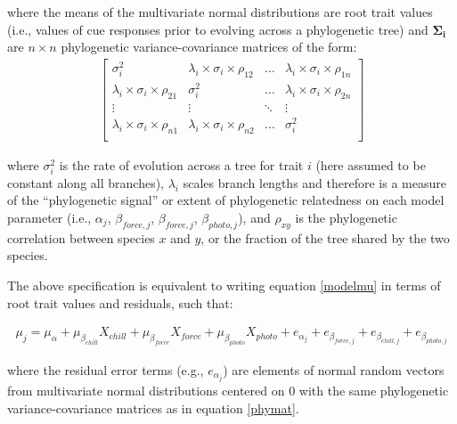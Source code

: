 \documentclass[11pt]{article}
\begin{document}
\noindent where the means of the multivariate normal distributions are root trait values (i.e., values of cue responses prior to evolving across a phylogenetic tree) and $\boldsymbol{\Sigma_i}$ %
are $n \times n$ phylogenetic variance-covariance matrices of the form: \\ 
\begin{align}
  \label{phymat}
\begin{bmatrix}
  \sigma^2_i & \lambda_i \times \sigma_{i} \times \rho_{12} & \ldots & \lambda_i \times \sigma_{i} \times \rho_{1n} \\
  \lambda_i \times \sigma_i \times \rho_{21} & \sigma^2_i & \ldots & \lambda_i \times \sigma_{i} \times \rho_{2n} \\
  \vdots & \vdots & \ddots & \vdots \\
  \lambda_i \times \sigma_i \times \rho_{n1} & \lambda_i \times \sigma_i \times \rho_{n2} & \ldots & \sigma^2_i \\
\end{bmatrix}
\end{align}

\noindent where $\sigma_i^2$ is the rate of evolution across a tree for trait $i$ (here assumed to be constant along all branches), $\lambda_i$ scales branch lengths and therefore is a measure of the ``phylogenetic signal'' or extent of phylogenetic relatedness on each model parameter (i.e., $\alpha_{j}$, $\beta_{force,j}$, $\beta_{force,j}$, $\beta_{photo,j}$), and $\rho_{xy}$ is the phylogenetic correlation between species $x$ and $y$, or the fraction of the tree shared by the two species.

The above specification is equivalent to writing equation \ref{modelmu} in terms of root trait values and residuals, such that:

\begin{align}
  \label{eqfive}
  \mu_j = \mu_\alpha + \mu_{\beta_{chill}} X_{chill} + \mu_{\beta_{force}} X_{force} + \mu_{\beta_{photo}} X_{photo} + e_{\alpha_{j}} + e_{\beta_{force,j}} + e_{\beta_{chill,j}} + e_{\beta_{photo,j}}
\end{align}

\noindent where the residual error terms (e.g., $e_{\alpha_{j}}$) are elements of normal random vectors from multivariate normal distributions centered on $0$ with the same phylogenetic variance-covariance matrices as in equation \ref{phymat}.
\end{document}
